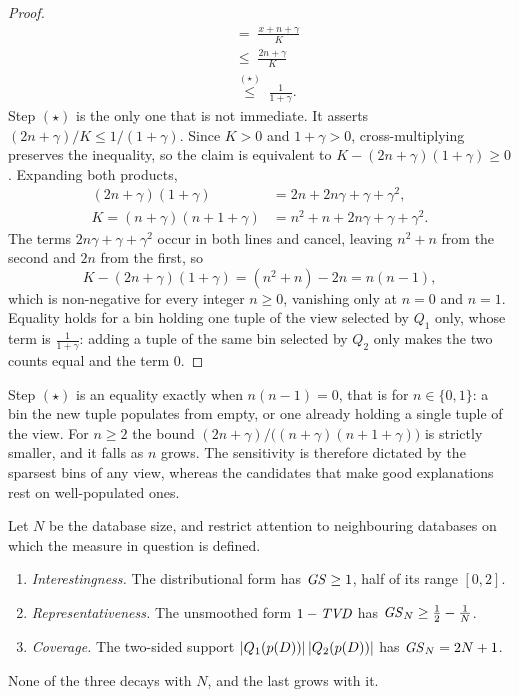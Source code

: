 \begin{proof}
\begin{align*}
&\;=\;\frac{x+n+\gamma}{K}\\[2pt]
&\;\le\;\frac{2n+\gamma}{K}\\[2pt]
&\;\overset{(\star)}{\le}\;\frac{1}{1+\gamma}.
\end{align*}
Step $(\star)$ is the only one that is not immediate.
It asserts $(2n+\gamma)/K\le 1/(1+\gamma)$.
Since $K>0$ and $1+\gamma>0$, cross-multiplying preserves the inequality, so the claim is equivalent to $K-(2n+\gamma)(1+\gamma)\ge0$.
Expanding both products,
\begin{align*}
(2n+\gamma)(1+\gamma)&=2n+2n\gamma+\gamma+\gamma^2,\\[2pt]
K=(n+\gamma)(n+1+\gamma)&=n^2+n+2n\gamma+\gamma+\gamma^2 .
\end{align*}
The terms $2n\gamma+\gamma+\gamma^2$ occur in both lines and cancel, leaving $n^2+n$ from the second and $2n$ from the first, so
\[
K-(2n+\gamma)(1+\gamma)=(n^2+n)-2n=n(n-1),
\]
which is non-negative for every integer $n\ge0$, vanishing only at $n=0$ and $n=1$.
Equality holds for a bin holding one tuple of the view selected by $Q_1$ only, whose term is $\frac{1}{1+\gamma}$: adding a tuple of the same bin selected by $Q_2$ only makes the two counts equal and the term $0$.
\end{proof}

Step $(\star)$ is an equality exactly when $n(n-1)=0$, that is for $n\in\{0,1\}$: a bin the new tuple populates from empty, or one already holding a single tuple of the view.
For $n\ge2$ the bound $(2n+\gamma)/\big((n+\gamma)(n+1+\gamma)\big)$ is strictly smaller, and it falls as $n$ grows.
The sensitivity is therefore dictated by the sparsest bins of any view, whereas the candidates that make good explanations rest on well-populated ones.

\begin{proposition}
\label{prop:sensitivity-itemized}
Let $N$ be the database size, and restrict attention to neighbouring databases on which the measure in question is defined.
\begin{enumerate}[label=(\roman*),leftmargin=*]
\item \emph{Interestingness.} The distributional form has $\mathit{GS}\ge1$, half of its range $[0,2]$.
\item \emph{Representativeness.} The unsmoothed form $1-\mathit{TVD}$ has $\mathit{GS}_N\ge\frac12-\frac1N$.
\item \emph{Coverage.} The two-sided support $|Q_1(p(D))|\,|Q_2(p(D))|$ has $\mathit{GS}_N=2N+1$.
\end{enumerate}
None of the three decays with $N$, and the last grows with it.
\end{proposition}

